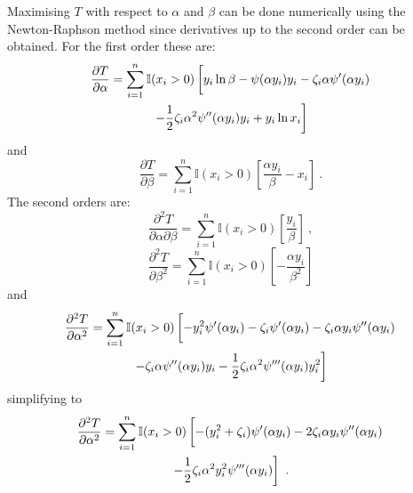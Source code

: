 \documentclass[12pt, a4paper]{memoir}
\begin{document}
Maximising $T$ with respect to $\alpha$ and $\beta$ can be done numerically using the Newton-Raphson method since derivatives up to the second order can be obtained. For the first order these are:
\begin{multline}
\frac{\partial T}{\partial \alpha} = \sum_{i=1}^n\mathbb{I}(x_i>0)\left[
	y_i\ln\beta -\psi(\alpha y_i)y_i-\zeta_i\alpha\psi'(\alpha y_i)
	\vphantom{\frac{1}{1}}\right.\\\left.
	- \frac{1}{2}\zeta_i\alpha^2\psi''(\alpha y_i)y_i + y_i\ln x_i
\right]
\end{multline}
and
\begin{equation}
\frac{\partial T}{\partial \beta} = \sum_{i=1}^n\mathbb{I}(x_i>0)\left[
\frac{\alpha y_i}{\beta}-x_i
\right] \ .
\end{equation}
The second orders are:
\begin{equation}
\frac{\partial^2 T}{\partial \alpha \partial \beta} =
\sum_{i=1}^n \mathbb{I}(x_i>0)\left[\frac{y_i}{\beta}\right] \ ,
\label{eq:compoundPoisson:d2tdadb}
\end{equation}
\begin{equation}
\frac{\partial^2 T}{\partial \beta^2} = \sum_{i=1}^n\mathbb{I}(x_i>0)\left[-\frac{\alpha y_i}{\beta^2}
\right]
\label{eq:compoundPoisson:d2td2b}
\end{equation}
and
\begin{multline*}
\frac{\partial^2 T}{\partial \alpha^2} =  \sum_{i=1}^n\mathbb{I}(x_i>0)\left[
	-y_i^2\psi'(\alpha y_i) - \zeta_i\psi'(\alpha y_i) - \zeta_i\alpha y_i\psi''(\alpha y_i)
	\vphantom{\frac{1}{2}}\right.\\\left.	
	- \zeta_i\alpha\psi''(\alpha y_i)y_i
	-\frac{1}{2}\zeta_i\alpha^2\psi'''(\alpha y_i)y_i^2
\right]
\end{multline*}
simplifying to
\begin{multline}
\frac{\partial^2 T}{\partial \alpha^2} =  \sum_{i=1}^n\mathbb{I}(x_i>0)\left[
	-(y_i^2+\zeta_i)\psi'(\alpha y_i) - 2\zeta_i\alpha y_i\psi''(\alpha y_i)
	\vphantom{\frac{1}{2}}\right.\\\left.	
	-\frac{1}{2}\zeta_i\alpha^2y_i^2\psi'''(\alpha y_i)
\right] \ .
\label{eq:compoundPoisson:d2td2a}
\end{multline}
\end{document}
